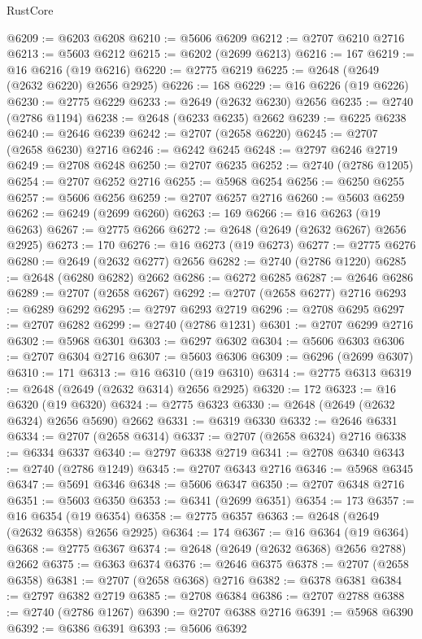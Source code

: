 \begin{lexlean}{RustCore}
\begin{coremodule}
@6209 := @6203 @6208
@6210 := @5606 @6209
@6212 := @2707 @6210 @2716
@6213 := @5603 @6212
@6215 := @6202 (@2699 @6213)
@6216 := 167
@6219 := @16 @6216 (@19 @6216)
@6220 := @2775 @6219
@6225 := @2648 (@2649 (@2632 @6220) @2656 @2925)
@6226 := 168
@6229 := @16 @6226 (@19 @6226)
@6230 := @2775 @6229
@6233 := @2649 (@2632 @6230) @2656
@6235 := @2740 (@2786 @1194)
@6238 := @2648 (@6233 @6235) @2662
@6239 := @6225 @6238
@6240 := @2646 @6239
@6242 := @2707 (@2658 @6220)
@6245 := @2707 (@2658 @6230) @2716
@6246 := @6242 @6245
@6248 := @2797 @6246 @2719
@6249 := @2708 @6248
@6250 := @2707 @6235
@6252 := @2740 (@2786 @1205)
@6254 := @2707 @6252 @2716
@6255 := @5968 @6254
@6256 := @6250 @6255
@6257 := @5606 @6256
@6259 := @2707 @6257 @2716
@6260 := @5603 @6259
@6262 := @6249 (@2699 @6260)
@6263 := 169
@6266 := @16 @6263 (@19 @6263)
@6267 := @2775 @6266
@6272 := @2648 (@2649 (@2632 @6267) @2656 @2925)
@6273 := 170
@6276 := @16 @6273 (@19 @6273)
@6277 := @2775 @6276
@6280 := @2649 (@2632 @6277) @2656
@6282 := @2740 (@2786 @1220)
@6285 := @2648 (@6280 @6282) @2662
@6286 := @6272 @6285
@6287 := @2646 @6286
@6289 := @2707 (@2658 @6267)
@6292 := @2707 (@2658 @6277) @2716
@6293 := @6289 @6292
@6295 := @2797 @6293 @2719
@6296 := @2708 @6295
@6297 := @2707 @6282
@6299 := @2740 (@2786 @1231)
@6301 := @2707 @6299 @2716
@6302 := @5968 @6301
@6303 := @6297 @6302
@6304 := @5606 @6303
@6306 := @2707 @6304 @2716
@6307 := @5603 @6306
@6309 := @6296 (@2699 @6307)
@6310 := 171
@6313 := @16 @6310 (@19 @6310)
@6314 := @2775 @6313
@6319 := @2648 (@2649 (@2632 @6314) @2656 @2925)
@6320 := 172
@6323 := @16 @6320 (@19 @6320)
@6324 := @2775 @6323
@6330 := @2648 (@2649 (@2632 @6324) @2656 @5690) @2662
@6331 := @6319 @6330
@6332 := @2646 @6331
@6334 := @2707 (@2658 @6314)
@6337 := @2707 (@2658 @6324) @2716
@6338 := @6334 @6337
@6340 := @2797 @6338 @2719
@6341 := @2708 @6340
@6343 := @2740 (@2786 @1249)
@6345 := @2707 @6343 @2716
@6346 := @5968 @6345
@6347 := @5691 @6346
@6348 := @5606 @6347
@6350 := @2707 @6348 @2716
@6351 := @5603 @6350
@6353 := @6341 (@2699 @6351)
@6354 := 173
@6357 := @16 @6354 (@19 @6354)
@6358 := @2775 @6357
@6363 := @2648 (@2649 (@2632 @6358) @2656 @2925)
@6364 := 174
@6367 := @16 @6364 (@19 @6364)
@6368 := @2775 @6367
@6374 := @2648 (@2649 (@2632 @6368) @2656 @2788) @2662
@6375 := @6363 @6374
@6376 := @2646 @6375
@6378 := @2707 (@2658 @6358)
@6381 := @2707 (@2658 @6368) @2716
@6382 := @6378 @6381
@6384 := @2797 @6382 @2719
@6385 := @2708 @6384
@6386 := @2707 @2788
@6388 := @2740 (@2786 @1267)
@6390 := @2707 @6388 @2716
@6391 := @5968 @6390
@6392 := @6386 @6391
@6393 := @5606 @6392

\end{coremodule}
\end{lexlean}
